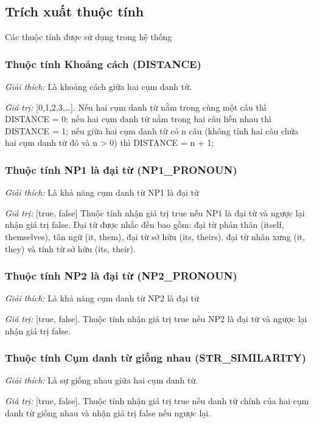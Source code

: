 \documentclass[12pt]{extarticle}
\begin{document}
		\subsection{Trích xuất thuộc tính}

			\begin{table}[H]
				\centering
				
				\caption{Các thuộc tính được sử dụng trong hệ thống}
				\label{features_table}
			\end{table}

			\subsubsection*{Thuộc tính Khoảng cách (DISTANCE)}
				\par \textit{Giải thích:} Là khoảng cách giữa hai cụm danh từ.
				\par \textit{Giá trị:} [0,1,2,3,…]. Nếu hai cụm danh từ nằm trong cùng một câu thì DISTANCE = 0; nếu hai cụm danh từ nằm trong hai câu liền nhau thì DISTANCE = 1; nếu giữa hai cụm danh từ có n câu (không tính hai câu chứa hai cụm danh từ đó và n > 0) thì DISTANCE = n + 1;
 
			\subsubsection*{Thuộc tính NP1 là đại từ (NP1\_PRONOUN)}
				\par \textit{Giải thích:} Là khả năng cụm danh từ NP1 là đại từ
				\par \textit{Giá trị:} [true, false] Thuộc tính nhận giá trị true nếu NP1 là đại từ và ngược lại nhận giá trị false. Đại từ được nhắc đến bao gồm: đại từ phản thân (itself, themselves), tân ngữ (it, them), đại từ sở hữu (its, theirs), đại từ nhân xưng (it, they) và tính từ sở hữu (its, their).

			\subsubsection*{Thuộc tính NP2 là đại từ (NP2\_PRONOUN)}
				\par \textit{Giải thích:} Là khả năng cụm danh từ NP2 là đại từ
				\par \textit{Giá trị:} [true, false]. Thuộc tính nhận giá trị true nếu NP2 là đại từ và ngược lại nhận giá trị false.

			\subsubsection*{Thuộc tính Cụm danh từ giống nhau (STR\_SIMILARITY)}
				\par \textit{Giải thích:} Là sự giống nhau giữa hai cụm danh từ.
				\par \textit{Giá trị:} [true, false]. Thuộc tính nhận giá trị true nếu danh từ chính của hai cụm danh từ giống nhau và nhận giá trị false nếu ngược lại.
\end{document}

